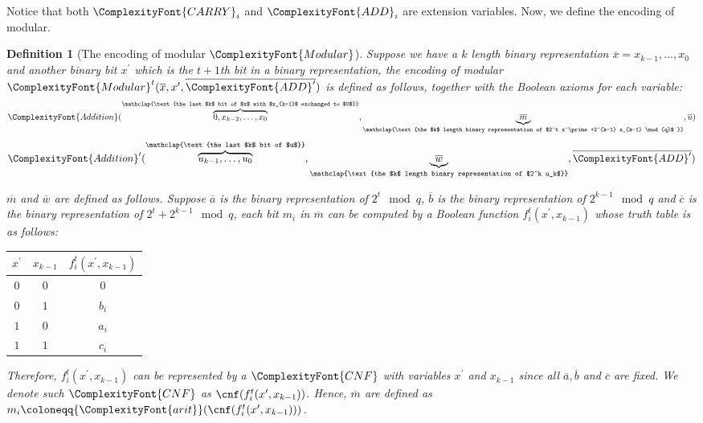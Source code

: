 \documentclass[11pt,letter]{article}
\newtheorem{definition}[theorem]{Definition}
\theoremstyle{remark} %
\newcommand{\CNF}{ %
    {
        \ComplexityFont{CNF}
    }
}
\newcommand{\arit}{ %
    {
        \ComplexityFont{arit}
    }
}
\newcommand{\carry}{ %
    {
        \ComplexityFont{CARRY}
    }
}
\newcommand{\add}{ %
    {
        \ComplexityFont{ADD}
    }
}
\newcommand{\addition}{ %
    {
        \ComplexityFont{Addition}
    }
}
\newcommand{\modular}{ %
    {
        \ComplexityFont{Modular}
    }
}
\begin{document}
{    Notice that both $\carry_i$ and $\add_i$ are extension variables. Now, we define the encoding of modular.
    \begin{definition}[The encoding of modular $\modular$]
        \label{def: modular}
        Suppose we have a $k$ length binary representation $\overline{x} = x_{k-1} ,\dots, x_0$ and another binary bit $x^\prime$ which is the $t+1$th bit in a binary representation, the encoding of modular $\modular^t(\overline{x},x^\prime, \overline{\add^\prime})$ is defined as follows, together with the Boolean axioms for each variable:
        \[
            \addition(\overbrace{0, x_{k-2},\dots,x_0}^{\mathclap{\text{the last $k$ bit of $x$ with $x_{k-1}$ exchanged to $0$}}}, \underbrace{\overline{m}}_{\mathclap{\text{the $k$ length binary representation of $2^t x^\prime +2^{k-1} x_{k-1} \mod{q}$ }}}, \overline{u})
        \]
        \[
            \addition^\prime(\overbrace{u_{k-1},\dots,u_0}^{\mathclap{\text{the last $k$ bit of $u$}}}, \underbrace{\overline{w}}_{\mathclap{\text{the $k$ length binary representation of $2^k u_k$}}},\overline{\add^\prime})
        \]
        
        $\overline{m}$ and $\overline{w}$ are defined as follows. Suppose $\overline{a}$ is the binary representation of $2^t \mod{q}$, $\overline{b}$ is the binary representation of $2^{k-1} \mod{q}$ and $\overline{c}$ is the binary representation of $2^t + 2^{k-1} \mod{q}$, each bit $m_i$ in $\overline{m}$ can be computed by a Boolean function $f_i^t(x^\prime, x_{k-1})$ whose truth table is as follows:\\
        \begin{center}
            \begin{tabular}{c|c|c}
                \hline
                $x^\prime$  &  $x_{k-1}$ & $f_i^t(x^\prime, x_{k-1})$ \\
                \hline
                $0$ & $0$ & $0$\\
                \hline
                $0$ & $1$ & $b_i$ \\
                \hline
                $1$ & $0$ & $a_i$ \\
                \hline
                $1$ & $1$ & $c_i$ \\ 
                \hline
            \end{tabular}
        \end{center}

        Therefore, $f_i^t(x^\prime, x_{k-1})$ can be represented by a $\CNF$ with variables $x^\prime$ and $x_{k-1}$ since all $\overline{a},\overline{b}$ and $\overline{c}$ are fixed. We denote such $\CNF$ as $\cnf(f_i^t(x^\prime, x_{k-1}))$. Hence, $\overline{m}$ are defined as $m_i \coloneqq \arit(\cnf(f_i^t(x^\prime, x_{k-1})))$.


\end{definition}}
\end{document}
